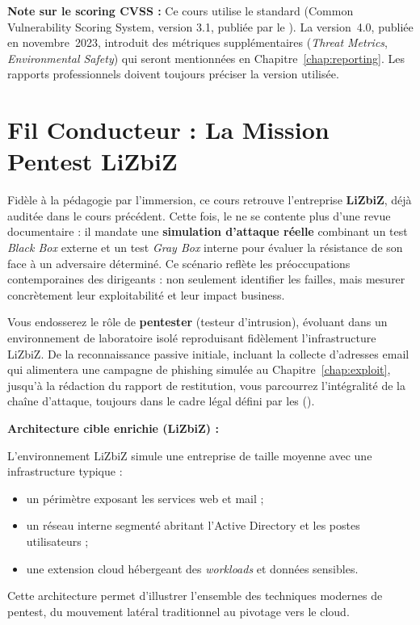 \begin{boxinfo}
\textbf{Note sur le scoring CVSS :} Ce cours utilise le standard
 (Common Vulnerability Scoring System, version 3.1, publiée
par le ). La version~4.0, publiée en novembre~2023, introduit
des métriques supplémentaires (\textit{Threat Metrics}, \textit{Environmental
Safety}) qui seront mentionnées en Chapitre~\ref{chap:reporting}. Les
rapports professionnels doivent toujours préciser la version utilisée.
\end{boxinfo}

\section*{Fil Conducteur : La Mission Pentest LiZbiZ}

Fidèle à la pédagogie par l'immersion, ce cours retrouve l'entreprise
\textbf{LiZbiZ}, déjà auditée dans le cours précédent. Cette fois, le 
ne se contente plus d'une revue documentaire : il mandate une \textbf{simulation
d'attaque réelle} combinant un test \textit{Black Box} externe et un test
\textit{Gray Box} interne pour évaluer la résistance de son  face à un
adversaire déterminé. Ce scénario reflète les préoccupations contemporaines des
dirigeants : non seulement identifier les failles, mais mesurer concrètement leur
exploitabilité et leur impact business.

Vous endosserez le rôle de \textbf{pentester} (testeur d'intrusion), évoluant dans
un environnement de laboratoire isolé reproduisant fidèlement l'infrastructure
LiZbiZ. De la reconnaissance passive initiale, incluant la collecte d'adresses
email qui alimentera une campagne de phishing simulée au
Chapitre~\ref{chap:exploit}, jusqu'à la rédaction du rapport de restitution, vous
parcourrez l'intégralité de la chaîne d'attaque, toujours dans le cadre légal défini
par les  ().

\begin{boxinfo}
\textbf{Architecture cible enrichie (LiZbiZ) :}

L'environnement LiZbiZ simule une entreprise de taille moyenne avec une
infrastructure typique :
\begin{itemize}
    \item un périmètre  exposant les services web et mail ;
    \item un réseau interne segmenté abritant l'Active Directory et les postes
          utilisateurs ;
    \item une extension cloud hébergeant des \textit{workloads} et données
          sensibles.
\end{itemize}
Cette architecture permet d'illustrer l'ensemble des techniques modernes de
pentest, du mouvement latéral traditionnel au pivotage vers le cloud.
\end{boxinfo}

